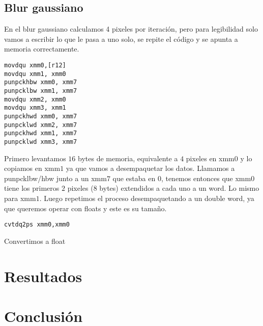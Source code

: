\documentclass[a4paper]{article}
\begin{document}
\subsection{Blur gaussiano}

\noindent En el blur gaussiano calculamos 4 pixeles por iteración, pero para legibilidad solo vamos a escribir lo que le pasa a uno solo, se repite el código y se apunta a memoria correctamente. 

\begin{codesnippet}
\begin{verbatim}
movdqu xmm0,[r12]  
movdqu xmm1, xmm0
punpckhbw xmm0, xmm7 
punpcklbw xmm1, xmm7  
movdqu xmm2, xmm0
movdqu xmm3, xmm1
punpckhwd xmm0, xmm7  	
punpcklwd xmm2, xmm7   
punpckhwd xmm1, xmm7  
punpcklwd xmm3, xmm7  
\end{verbatim}
\end{codesnippet}

\noindent Primero levantamos $16$ bytes de memoria, equivalente a $4$ pixeles en xmm$0$ y lo copiamos en xmm$1$ ya que vamos a desempaquetar los datos. Llamamos a punpcklbw/hbw junto a un xmm$7$ que estaba en $0$, tenemos entonces que xmm$0$ tiene los primeros $2$ pixeles ($8$ bytes) extendidos a cada uno a un word. Lo mismo para xmm$1$. Luego repetimos el proceso desempaquetando a un double word, ya que queremos operar con floats y este es su tamaño. 

\begin{codesnippet}
\begin{verbatim}
cvtdq2ps xmm0,xmm0
\end{verbatim}
\end{codesnippet}

\noindent Convertimos a float 








\section{Resultados}

\section{Conclusión}
\end{document}
